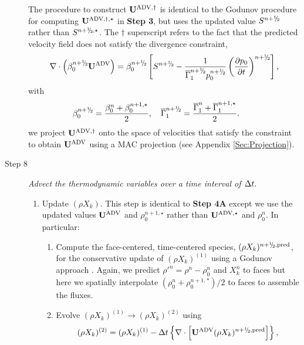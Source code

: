 \begin{description}
The procedure to construct ${\bf{U}}^{\mathrm{ADV},\dagger}$ is identical to the Godunov procedure
for computing ${\bf{U}}^{\mathrm{ADV},\dagger,\star}$ in {\bf Step 3}, but uses
the updated value $S^{\nph}$ rather than $S^{\nph,\star}$.
The $\dagger$ superscript refers to the fact that the predicted velocity field does not satisfy the divergence constraint,
\begin{equation}
\nabla \cdot \left(\beta_0^{\nph} \uadvtwo\right) =
\beta_0^{\nph} \left[S^{\nph} - \frac{1}{\gammaonebar^{\nph}p_0^{\nph}}\left(\frac{\partial p_0}{\partial t}\right)^{\nph}\right],\label{eq:div2}
\end{equation}
with
\begin{equation}
\beta_0^{\nph} = \frac{ \beta_0^n +  \beta_0^{n+1,\star} }{2}, \quad
\gammaonebar^{\nph} = \frac{ \gammaonebar^n +  \gammaonebar^{n+1,\star} }{2}.
\qquad
\end{equation}
we project ${\bf{U}}^{\mathrm{ADV},\dagger}$ onto the space of velocities that satisfy the constraint to obtain ${\bf{U}}^{\mathrm{ADV}}$ using a MAC projection (see Appendix \ref{Sec:Projection}).

\item[Step 8] {\em Advect the thermodynamic variables over a time interval of $\Delta t.$}

\begin{enumerate}
\renewcommand{\theenumi}{{\bf \Alph{enumi}}}

\item Update $(\rho X_k)$.  This step is identical to {\bf Step 4A} except we use
  the updated values ${\bf{U}}^{\mathrm{ADV}}$ and $\rho_0^{n+1,\star}$ rather than
  ${\bf{U}}^{\mathrm{ADV},\star}$ and $\rho_0^n$.  In particular:

\begin{enumerate}
\renewcommand{\labelenumii}{{\bf \roman{enumii}}.}

\item Compute the face-centered, time-centered species, $(\rho X_k)^{\nph,\pred}$,
  for the conservative update of $(\rho X_k)^{(1)}$ using a Godunov approach \citep{XRB_III}.
  Again, we predict $\rho'^n=\rho^n-\rho_0^n$ and $X_k^n$ to faces
  but here we spatially interpolate $(\rho_0^n+\rho_0^{n+1,*})/2$ to faces to assemble the fluxes.


\item Evolve $(\rho X_k)^{(1)} \rightarrow (\rho X_k)^{(2)}$ using
\begin{equation}
(\rho X_k)^{(2)} = (\rho X_k)^{(1)}
- \dt \left\{ \nabla \cdot \left[\uadvtwo (\rho X_k)^{\nph,\pred} \right] \right\},
\end{equation}


\end{enumerate}
\end{enumerate}
\end{description}
